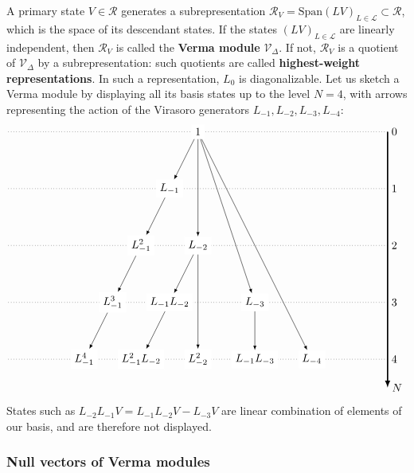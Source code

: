 \documentclass[12pt, a4paper]{article}
\newcommand{\myindex}[1]{\textbf{\boldmath #1}}
\theoremstyle{break}
\begin{document}
A primary state $V{} \in \mathcal{R}$ generates a subrepresentation $\mathcal{R}_{V{}}= \text{Span}(LV{})_{L\in\mathcal{L}}\subset\mathcal{R}$, which is the space of its descendant states. If the states $(LV{})_{L\in\mathcal{L}}$ are linearly independent, then $\mathcal{R}_{V{}}$ is called the \myindex{Verma module} $\mathcal{V}_\Delta$. If not, $\mathcal{R}_{V{}}$ is a quotient of $\mathcal{V}_\Delta$ by a subrepresentation: such quotients are called \myindex{highest-weight representations}. In such a representation, $L_0$ is diagonalizable. 
Let us sketch a Verma module by displaying all its basis states up to the level $N=4$, with arrows representing the action of the Virasoro generators $L_{-1},L_{-2},L_{-3},L_{-4}$:
 \begin{align}
 \begin{tikzpicture}[scale = .3, baseline=(current  bounding  box.center)]
  \draw[-latex, very thick] (20, 0) -- (20, -27) node [right] {$N$};
  \foreach \x in {0, ..., 4}
  {
  \draw [dotted] (-20, {-6*\x}) -- (20, {-6*\x}) node [right] {${\x}$};
  }
  \node[fill = white] at (0, 0) (0) {$1$};
  \node[fill = white] at (-3,-6) (1) {$L_{-1}$};
  \node[fill = white] at (-6, -12) (11) {$L_{-1}^2$};
  \node[fill = white] at (-9, -18) (111) {$L_{-1}^3$};
  \node[fill = white] at (-12, -24) (1111) {$L_{-1}^4$};
  \node[fill = white] at (0,-12) (2) {$L_{-2}$};
  \node[fill = white] at (-3,-18) (12) {$L_{-1}L_{-2}$};
  \node[fill = white] at (-6,-24) (112) {$L_{-1}^2L_{-2}$};
  \node[fill = white] at (0,-24) (22) {$L_{-2}^2$};
  \node[fill = white] at (6,-18) (3) {$L_{-3}$};
  \node[fill = white] at (6,-24) (13) {$L_{-1}L_{-3}$};
  \node[fill = white] at (12,-24) (4) {$L_{-4}$};
  \draw[-latex] (0) -- (1);
  \draw[-latex] (1) -- (11);
  \draw[-latex] (11) -- (111);
  \draw[-latex] (111) -- (1111);
  \draw[-latex] (0) -- (2);
  \draw[-latex] (0) -- (3);
  \draw[-latex] (0) -- (4);
  \draw[-latex] (2) -- (12);
  \draw[-latex] (12) -- (112);
  \draw[-latex] (2) -- (22);
  \draw[-latex] (3) -- (13);
 \end{tikzpicture}
\end{align}
States such as 
$L_{-2}L_{-1}V = L_{-1}L_{-2}V -L_{-3}V$ are linear combination of elements of our basis, and are therefore not displayed.

\subsubsection{Null vectors of Verma modules}\label{sec:nvvm}
\end{document}
